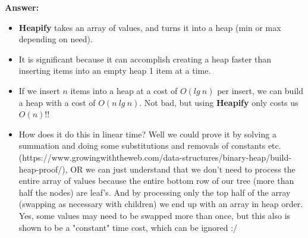 \documentclass[12pt]{exam}
\newcommand{\ans}[1]{\textcolor{dgreen}{#1}}
\newcommand{\ansbox}[1]{
\textcolor{dgreen}{\textbf{Answer:}}\\
\noindent\colorbox[gray]{0.90}{%
    \parbox{\textwidth - 12 \fboxsep}{\ans{#1}}%
}}
\begin{document}
\begin{questions}
    \ansbox{
    \begin{itemize}
        \item \textbf{Heapify} takes an array of values, and turns it into a heap (min or max depending on need). 
        \item It is significant because it can accomplish creating a heap faster than inserting items into an empty 
    heap 1 item at a time. 
        \item If we insert $n$ items into a heap at a cost of $O(lg\ n)$ per insert, we can build a heap
    with a cost of $O(n\ lg\ n)$. Not bad, but using \textbf{Heapify} only costs us $O(n)$!! 
        \item How does it do this in linear time? Well we could prove it by solving a summation and doing 
        some substitutions and removals of constants etc. (https://www.growingwiththeweb.com/data-structures/binary-heap/build-heap-proof/), OR we can just understand 
        that we don't need to process the entire array of values because the entire bottom row of our tree (more than half the nodes) are leaf's. And by processing only the top half of the array (swapping as necessary with children) we end up with an array in heap order. Yes, some values may need to be swapped more than once, but this also is shown to be a "constant" time cost, which can be ignored :/  
    \end{itemize}
    }


\end{questions}
\end{document}

